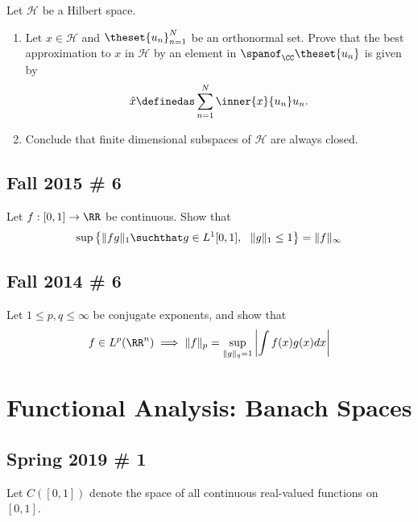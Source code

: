 Let \(\mathcal H\) be a Hilbert space.

\begin{enumerate}
\def\labelenumi{\arabic{enumi}.}
\tightlist
\item
  Let \(x\in \mathcal H\) and \(\theset{u_n}_{n=1}^N\) be an orthonormal
  set. Prove that the best approximation to \(x\) in \(\mathcal H\) by
  an element in \(\spanof_\CC\theset{u_n}\) is given by
  \begin{align*}
    \hat x \definedas \sum_{n=1}^N \inner{x}{u_n}u_n.
    \end{align*}
\item
  Conclude that finite dimensional subspaces of \(\mathcal H\) are
  always closed.
\end{enumerate}

\hypertarget{fall-2015-6}{%
\subsection{Fall 2015 \# 6}\label{fall-2015-6}}

Let \(f: [0, 1] \to \RR\) be continuous. Show that
\begin{align*}
\sup \left\{\|f g\|_{1} \suchthat g \in L^{1}[0,1],~~ \|g\|_{1} \leq 1\right\}=\|f\|_{\infty}
\end{align*}

\hypertarget{fall-2014-6}{%
\subsection{Fall 2014 \# 6}\label{fall-2014-6}}

Let \(1 \leq p,q \leq \infty\) be conjugate exponents, and show that
\begin{align*}
f \in L^p(\RR^n) \implies \|f\|_{p} = \sup _{\|g\|_{q}=1}\left|\int f(x) g(x) d x\right|
\end{align*}

\hypertarget{functional-analysis-banach-spaces}{%
\section{Functional Analysis: Banach
Spaces}\label{functional-analysis-banach-spaces}}

\hypertarget{spring-2019-1}{%
\subsection{Spring 2019 \# 1}\label{spring-2019-1}}

Let \(C([0, 1])\) denote the space of all continuous real-valued
functions on \([0, 1]\).

